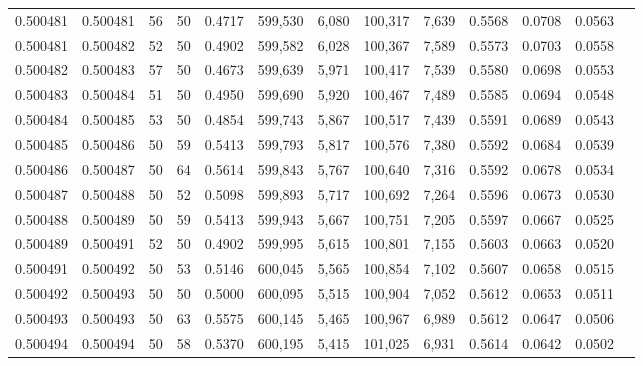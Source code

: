\begin{tabular}{rrrrrrrrrrrrr}
0.500481 & 0.500481 &    56 &  50 &                                     0.4717 & 599,530 &   6,080 & 100,317 &   7,639 & 0.5568 & 0.0708 & 0.0563 \\
0.500481 & 0.500482 &    52 &  50 &                                     0.4902 & 599,582 &   6,028 & 100,367 &   7,589 & 0.5573 & 0.0703 & 0.0558 \\
0.500482 & 0.500483 &    57 &  50 &                                     0.4673 & 599,639 &   5,971 & 100,417 &   7,539 & 0.5580 & 0.0698 & 0.0553 \\
0.500483 & 0.500484 &    51 &  50 &                                     0.4950 & 599,690 &   5,920 & 100,467 &   7,489 & 0.5585 & 0.0694 & 0.0548 \\
0.500484 & 0.500485 &    53 &  50 &                                     0.4854 & 599,743 &   5,867 & 100,517 &   7,439 & 0.5591 & 0.0689 & 0.0543 \\
0.500485 & 0.500486 &    50 &  59 &                                     0.5413 & 599,793 &   5,817 & 100,576 &   7,380 & 0.5592 & 0.0684 & 0.0539 \\
0.500486 & 0.500487 &    50 &  64 &                                     0.5614 & 599,843 &   5,767 & 100,640 &   7,316 & 0.5592 & 0.0678 & 0.0534 \\
0.500487 & 0.500488 &    50 &  52 &                                     0.5098 & 599,893 &   5,717 & 100,692 &   7,264 & 0.5596 & 0.0673 & 0.0530 \\
0.500488 & 0.500489 &    50 &  59 &                                     0.5413 & 599,943 &   5,667 & 100,751 &   7,205 & 0.5597 & 0.0667 & 0.0525 \\
0.500489 & 0.500491 &    52 &  50 &                                     0.4902 & 599,995 &   5,615 & 100,801 &   7,155 & 0.5603 & 0.0663 & 0.0520 \\
0.500491 & 0.500492 &    50 &  53 &                                     0.5146 & 600,045 &   5,565 & 100,854 &   7,102 & 0.5607 & 0.0658 & 0.0515 \\
0.500492 & 0.500493 &    50 &  50 &                                     0.5000 & 600,095 &   5,515 & 100,904 &   7,052 & 0.5612 & 0.0653 & 0.0511 \\
0.500493 & 0.500493 &    50 &  63 &                                     0.5575 & 600,145 &   5,465 & 100,967 &   6,989 & 0.5612 & 0.0647 & 0.0506 \\
0.500494 & 0.500494 &    50 &  58 &                                     0.5370 & 600,195 &   5,415 & 101,025 &   6,931 & 0.5614 & 0.0642 & 0.0502 \\

\end{tabular}
